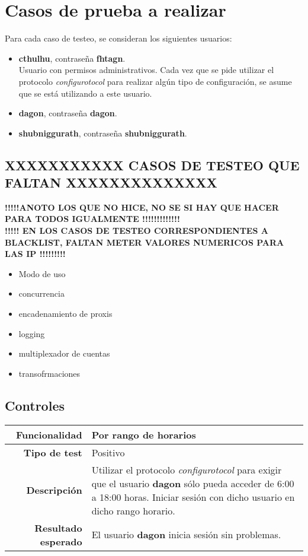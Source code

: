 \documentclass[a4paper,10pt]{article}
\begin{document}
\section{Casos de prueba a realizar}
Para cada caso de testeo, se consideran los siguientes usuarios:
\begin{itemize}
  \item \textbf{cthulhu}, contraseña \textbf{fhtagn}.\\
	Usuario con permisos administrativos. Cada vez que se pide utilizar el protocolo \textit{configurotocol}
	para realizar algún tipo de configuración, se asume que se está utilizando a este usuario.
  \item \textbf{dagon}, contraseña \textbf{dagon}.
  \item \textbf{shubniggurath}, contraseña \textbf{shubniggurath}.
\end{itemize}

\subsection{XXXXXXXXXXX CASOS DE TESTEO QUE FALTAN XXXXXXXXXXXXXX}
\textbf{!!!!!ANOTO LOS QUE NO HICE, NO SE SI HAY QUE HACER PARA TODOS IGUALMENTE !!!!!!!!!!!!!}\\
\textbf{!!!!! EN LOS CASOS DE TESTEO CORRESPONDIENTES A BLACKLIST, FALTAN METER VALORES NUMERICOS PARA LAS IP !!!!!!!!!}
\begin{itemize}
 \item Modo de uso
 \item concurrencia
 \item encadenamiento de proxis
 \item logging
 \item multiplexador de cuentas
 \item transofrmaciones
\end{itemize}

\subsection{Controles}

\begin{center}
  \begin{tabular}{|r|p{12.5cm}|}
    \hline
    \textbf{Funcionalidad}	&	Por rango de horarios\\
    \hline
    \textbf{Tipo de test}	&	Positivo\\
    \hline
    \textbf{Descripción}	&	Utilizar el protocolo \textit{configurotocol} para exigir que el usuario
					\textbf{dagon} sólo pueda acceder de 6:00 a 18:00 horas. Iniciar sesión con
					dicho usuario en dicho rango horario.\\
    \hline
    \textbf{Resultado esperado}	&	El usuario \textbf{dagon} inicia sesión sin problemas.\\
    \hline   
  \end{tabular}
\end{center}
\end{document}
